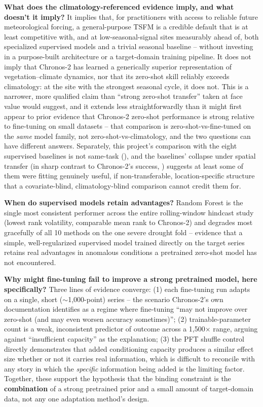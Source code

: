 \documentclass[11pt]{article}
\begin{document}
\textbf{What does the climatology-referenced evidence imply, and what doesn't it imply?} It implies
that, for practitioners with access to reliable future meteorological forcing, a general-purpose
TSFM is a credible default that is at least competitive with, and at low-seasonal-signal sites
measurably ahead of, both specialized supervised models and a trivial seasonal baseline -- without
investing in a purpose-built architecture or a target-domain training pipeline. It does not imply
that Chronos-2 has learned a generically superior representation of vegetation--climate dynamics,
nor that its zero-shot skill reliably exceeds climatology: at the site with the strongest seasonal
cycle, it does not. This is a narrower, more qualified claim than ``strong zero-shot transfer''
taken at face value would suggest, and it extends less straightforwardly than it might first
appear to prior evidence that Chronos-2 zero-shot performance is strong relative to fine-tuning on
small datasets \citep{arxiv2607.23146} -- that comparison is zero-shot-vs-fine-tuned on the
\emph{same} model family, not zero-shot-vs-climatology, and the two questions can have different
answers. Separately, this project's comparison with the eight supervised baselines is not
same-task (), and the baselines' collapse under spatial transfer (in
sharp contrast to Chronos-2's success, ) suggests at least some of
them were fitting genuinely useful, if non-transferable, location-specific structure that a
covariate-blind, climatology-blind comparison cannot credit them for.

\textbf{When do supervised models retain advantages?} Random Forest is the single most consistent
performer across the entire rolling-window hindcast study (lowest rank volatility, comparable mean rank to
Chronos-2) and degrades most gracefully of all 10 methods on the one severe drought fold --
evidence that a simple, well-regularized supervised model trained directly on the target series
retains real advantages in anomalous conditions a pretrained zero-shot model has not encountered.

\textbf{Why might fine-tuning fail to improve a strong pretrained model, here specifically?} Three
lines of evidence converge: (1) each fine-tuning run adapts on a single, short ($\sim$1{,}000-point)
series -- the scenario Chronos-2's own documentation identifies as a regime where fine-tuning
``may not improve over zero-shot (and may even worsen accuracy sometimes)''; (2)
trainable-parameter count is a weak, inconsistent predictor of outcome across a 1{,}500$\times$
range, arguing against ``insufficient capacity'' as the explanation; (3) the PFT shuffle control
directly demonstrates that added conditioning capacity produces a similar effect size whether or
not it carries real information, which is difficult to reconcile with any story in which the
\emph{specific} information being added is the limiting factor. Together, these support the
hypothesis that the binding constraint is the \textbf{combination} of a strong pretrained prior
and a small amount of target-domain data, not any one adaptation method's design.
\end{document}
